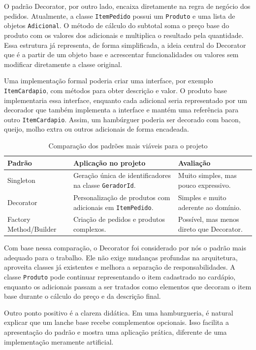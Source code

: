 \documentclass[12pt]{article}
\begin{document}
O padrão Decorator, por outro lado, encaixa diretamente na regra de negócio
dos pedidos. Atualmente, a classe \texttt{ItemPedido} possui um \texttt{Produto}
e uma lista de objetos \texttt{Adicional}. O método de cálculo do subtotal soma
o preço base do produto com os valores dos adicionais e multiplica o resultado
pela quantidade. Essa estrutura já representa, de forma simplificada, a ideia
central do Decorator que é a partir de um objeto base e acrescentar funcionalidades ou
valores sem modificar diretamente a classe original.

Uma implementação formal poderia criar uma interface, por exemplo
\texttt{ItemCardapio}, com métodos para obter descrição e valor. O produto base
implementaria essa interface, enquanto cada adicional seria representado por um
decorador que também implementa a interface e mantém uma referência para outro
\texttt{ItemCardapio}. Assim, um hambúrguer poderia ser decorado com bacon,
queijo, molho extra ou outros adicionais de forma encadeada.

\begin{table}[ht]
\centering
\caption{Comparação dos padrões mais viáveis para o projeto}
\label{tab:comparacao}
\begin{tabular}{p{3.2cm}p{7.6cm}p{2.7cm}}
\hline
\textbf{Padrão} & \textbf{Aplicação no projeto} & \textbf{Avaliação} \\
\hline
Singleton & Geração única de identificadores na classe \texttt{GeradorId}. & Muito simples, mas pouco expressivo. \\
Decorator & Personalização de produtos com adicionais em \texttt{ItemPedido}. & Simples e muito aderente ao domínio. \\
Factory Method/Builder & Criação de pedidos e produtos complexos. & Possível, mas menos direto que Decorator. \\
\hline
\end{tabular}
\end{table}

Com base nessa comparação, o Decorator foi considerado por nós o padrão mais adequado
para o trabalho. Ele não exige mudanças profundas na arquitetura, aproveita
classes já existentes e melhora a separação de responsabilidades. A classe
\texttt{Produto} pode continuar representando o item cadastrado no cardápio,
enquanto os adicionais passam a ser tratados como elementos que decoram o item
base durante o cálculo do preço e da descrição final.

Outro ponto positivo é a clareza didática. Em uma hamburgueria, é natural
explicar que um lanche base recebe complementos opcionais. Isso facilita a
apresentação do padrão e mostra uma aplicação prática, diferente de uma
implementação meramente artificial.
\end{document}
